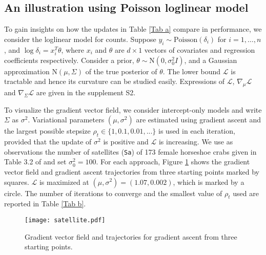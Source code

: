 \documentclass{statsoc}
\newcommand\mL{{\mathcal{L}}}
\newcommand\N{{\text{N}}}
\begin{document}
\subsection{An illustration using Poisson  loglinear model} \label{sec_Poisson}
To gain insights on how the updates in Table \ref{Tab a} compare in performance, we consider the loglinear model for counts. Suppose $y_i \sim \text{Poisson}(\delta_i)$ for $i=1, \dots, n$, and $\log \delta_i = x_i^T  \theta$, where $x_i$  and $\theta$ are $d \times 1$ vectors of covariates and regression coefficients respectively. Consider a prior, $\theta \sim \N(0, \sigma_0^2 I)$, and a Gaussian approximation $\N(\mu, \Sigma)$ of the true posterior of $\theta$. The lower bound $\mL$ is tractable and hence its curvature can be studied easily. Expressions of $\mL$, $\nabla_\mu \mL$ and $\nabla_\Sigma \mL$ are given in the supplement S2. 

To visualize the gradient vector field, we consider intercept-only models and write $\Sigma$ as $\sigma^2$. Variational parameters $(\mu, \sigma^2)$ are estimated using gradient ascent and the largest possible stepsize $\rho_t \in \{1, 0.1, 0.01, ...\}$ is used in each iteration, provided that the update of $\sigma^2$ is positive and $\mL$ is increasing. We use as observations the number of satellites ({\tt Sa}) of 173 female horseshoe crabs given in Table 3.2 of \cite{Agresti2018} and set $\sigma_0^2 = 100$. For each approach, Figure \ref{Fig a} shows the gradient vector field and gradient ascent trajectories from three starting points marked by squares. $\mL$ is maximized at $(\mu, \sigma^2) = (1.07, 0.002)$, which is marked by a circle. The number of iterations to converge and the smallest value of $\rho_t$ used are reported in Table \ref{Tab b}.

\begin{figure}[htb!]
\centering
\texttt{[image: satellite.pdf]}
\caption{Gradient vector field and trajectories for gradient ascent from three starting points.}
\label{Fig a}
\end{figure}

\begin{table}
\caption{\label{Tab b} Number of iterations in gradient ascent and smallest $\rho_t$ used.} 
\centering
{}
\end{table}
\end{document}
